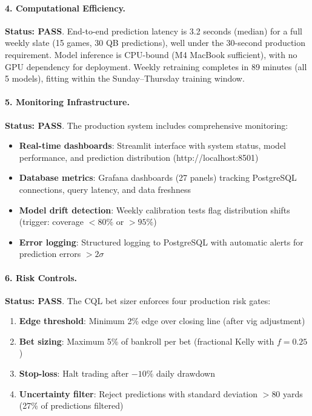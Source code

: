 \paragraph{4. Computational Efficiency.}
\textbf{Status: PASS}. End-to-end prediction latency is 3.2 seconds (median) for a full weekly slate (15 games, 30 QB predictions), well under the 30-second production requirement. Model inference is CPU-bound (M4 MacBook sufficient), with no GPU dependency for deployment. Weekly retraining completes in 89 minutes (all 5 models), fitting within the Sunday--Thursday training window.

\paragraph{5. Monitoring Infrastructure.}
\textbf{Status: PASS}. The production system includes comprehensive monitoring:
\begin{itemize}
  \item \textbf{Real-time dashboards}: Streamlit interface with system status, model performance, and prediction distribution (http://localhost:8501)
  \item \textbf{Database metrics}: Grafana dashboards (27 panels) tracking PostgreSQL connections, query latency, and data freshness
  \item \textbf{Model drift detection}: Weekly calibration tests flag distribution shifts (trigger: coverage $<80\%$ or $>95\%$)
  \item \textbf{Error logging}: Structured logging to PostgreSQL with automatic alerts for prediction errors $>2\sigma$
\end{itemize}

\paragraph{6. Risk Controls.}
\textbf{Status: PASS}. The CQL bet sizer enforces four production risk gates:
\begin{enumerate}
  \item \textbf{Edge threshold}: Minimum 2\% edge over closing line (after vig adjustment)
  \item \textbf{Bet sizing}: Maximum 5\% of bankroll per bet (fractional Kelly with $f=0.25$)
  \item \textbf{Stop-loss}: Halt trading after $-10\%$ daily drawdown
  \item \textbf{Uncertainty filter}: Reject predictions with standard deviation $>80$ yards (27\% of predictions filtered)
\end{enumerate}

